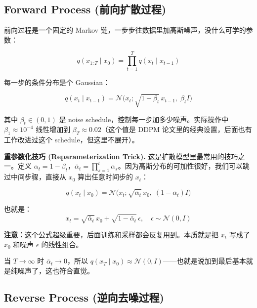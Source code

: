 \documentclass[11pt,a4paper]{article}
\theoremstyle{definition}
\newcommand{\N}{\mathcal{N}}          %
\newcommand{\alphat}{\bar{\alpha}_t}
\begin{document}
\subsection{Forward Process (前向扩散过程)}

前向过程是一个固定的 Markov 链，一步步往数据里加高斯噪声，没什么可学的参数：

\begin{equation}\label{eq:ddpm_forward}
    q(x_{1:T} \mid x_0) = \prod_{t=1}^{T} q(x_t \mid x_{t-1})
\end{equation}

每一步的条件分布是个 Gaussian：

\begin{equation}\label{eq:ddpm_forward_step}
    q(x_t \mid x_{t-1}) = \N\!\big(x_t; \sqrt{1 - \beta_t}\, x_{t-1},\; \beta_t I \big)
\end{equation}

其中 $\beta_t \in (0, 1)$ 是 noise schedule，控制每一步加多少噪声。实际操作中 $\beta_1 \approx 10^{-4}$ 线性增加到 $\beta_T \approx 0.02$（这个值是 DDPM 论文里的经典设置，后面也有工作改进过这个 schedule，但这里不展开）。

\medskip
\textbf{重参数化技巧 (Reparameterization Trick).} 这是扩散模型里最常用的技巧之一。定义 $\alpha_t = 1 - \beta_t$，$\alphat = \prod_{s=1}^{t} \alpha_s$。因为高斯分布的可加性很好，我们可以跳过中间步骤，直接从 $x_0$ 算出任意时间步的 $x_t$：

\begin{equation}\label{eq:ddpm_marginal}
    q(x_t \mid x_0) = \N\!\big(x_t; \sqrt{\alphat}\, x_0,\; (1 - \alphat) I \big)
\end{equation}

也就是：
\begin{equation}\label{eq:ddpm_reparam}
    x_t = \sqrt{\alphat}\, x_0 + \sqrt{1 - \alphat}\, \epsilon, \quad \epsilon \sim \N(0, I)
\end{equation}

\textbf{注意：}这个公式超级重要，后面训练和采样都会反复用到。本质就是把 $x_t$ 写成了 $x_0$ 和噪声 $\epsilon$ 的线性组合。

当 $T \to \infty$ 时 $\alphat \to 0$，所以 $q(x_T \mid x_0) \approx \N(0, I)$——也就是说加到最后基本就是纯噪声了，这也符合直觉。

\subsection{Reverse Process (逆向去噪过程)}
\end{document}
